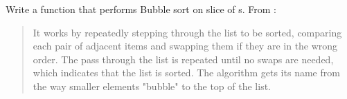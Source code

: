 \begin{Exercise}[title={Bubble sort},difficulty=5]
\label{ex:wc}
\Question\label{ex:wc q1} Write a function that performs 
Bubble sort on slice of s. From \cite{bubblesort}:
\begin{quote}
It works by repeatedly stepping through the list to be sorted, comparing each
pair of adjacent items and swapping them if they are in the wrong order. The
pass through the list is repeated until no swaps are needed, which indicates
that the list is sorted. The algorithm gets its name from the way smaller
elements "bubble" to the top of the list. 
\end{quote}

\end{Exercise}

\begin{Answer}
\Question 
\end{Answer}
